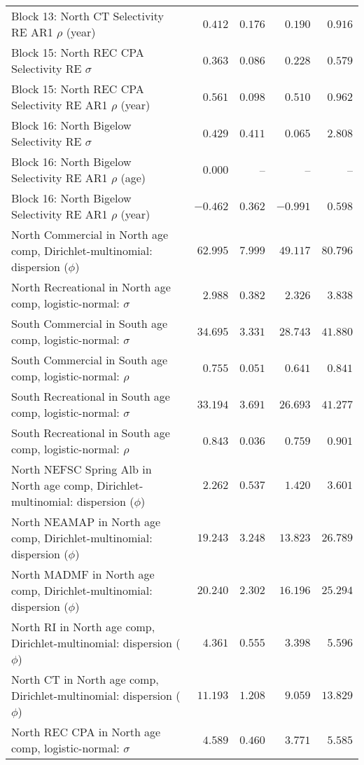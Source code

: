\documentclass[
]{article}
\begin{document}
\begin{landscape}
\begin{longtable}[t]{lrrrr}
Block 13: North CT Selectivity RE AR1 $\rho$ (year) & $0.412$ & $0.176$ & $0.190$ & $0.916$\\
\addlinespace
Block 15: North REC CPA Selectivity RE $\sigma$ & $0.363$ & $0.086$ & $0.228$ & $0.579$\\
Block 15: North REC CPA Selectivity RE AR1 $\rho$ (year) & $0.561$ & $0.098$ & $0.510$ & $0.962$\\
Block 16: North Bigelow Selectivity RE $\sigma$ & $0.429$ & $0.411$ & $0.065$ & $2.808$\\
Block 16: North Bigelow Selectivity RE AR1 $\rho$ (age) & $0.000$ & -- & -- & --\\
Block 16: North Bigelow Selectivity RE AR1 $\rho$ (year) & $-0.462$ & $0.362$ & $-0.991$ & $0.598$\\
\addlinespace
North Commercial in North age comp, Dirichlet-multinomial: dispersion ($\phi$) & $62.995$ & $7.999$ & $49.117$ & $80.796$\\
North Recreational in North age comp, logistic-normal: $\sigma$ & $2.988$ & $0.382$ & $2.326$ & $3.838$\\
South Commercial in South age comp, logistic-normal: $\sigma$ & $34.695$ & $3.331$ & $28.743$ & $41.880$\\
South Commercial in South age comp, logistic-normal: $\rho$ & $0.755$ & $0.051$ & $0.641$ & $0.841$\\
South Recreational in South age comp, logistic-normal: $\sigma$ & $33.194$ & $3.691$ & $26.693$ & $41.277$\\
\addlinespace
South Recreational in South age comp, logistic-normal: $\rho$ & $0.843$ & $0.036$ & $0.759$ & $0.901$\\
North NEFSC Spring Alb in North age comp, Dirichlet-multinomial: dispersion ($\phi$) & $2.262$ & $0.537$ & $1.420$ & $3.601$\\
North NEAMAP in North age comp, Dirichlet-multinomial: dispersion ($\phi$) & $19.243$ & $3.248$ & $13.823$ & $26.789$\\
North MADMF in North age comp, Dirichlet-multinomial: dispersion ($\phi$) & $20.240$ & $2.302$ & $16.196$ & $25.294$\\
North RI in North age comp, Dirichlet-multinomial: dispersion ($\phi$) & $4.361$ & $0.555$ & $3.398$ & $5.596$\\
\addlinespace
North CT in North age comp, Dirichlet-multinomial: dispersion ($\phi$) & $11.193$ & $1.208$ & $9.059$ & $13.829$\\
North REC CPA in North age comp, logistic-normal: $\sigma$ & $4.589$ & $0.460$ & $3.771$ & $5.585$\\

\end{longtable}
\end{landscape}
\end{document}
